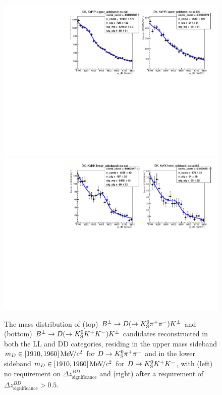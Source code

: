 \begin{figure}[tbp]
    \centering
    \includegraphics[width=0.55\columnwidth]{figures/analysis/charmless_ANA_K_PiPi_bothLLDD_Run1and2_c_upper_sideband_BD_ZSIG.pdf}
    \includegraphics[width=0.55\columnwidth]{figures/analysis/charmless_ANA_K_KK_bothLLDD_Run1and2_c_lower_sideband_BD_ZSIG.pdf}
    \caption{The \B mass distribution of (top) ${{B}^\pm}\rightarrow{\ensuremath{D}}(\rightarrow{\ensuremath{{K}^0_{\mathrm{S}}}}{\ensuremath{{\pi}^+}}{\ensuremath{{\pi}^-}}){{K}^\pm}$ and (bottom) ${{B}^\pm}\rightarrow{\ensuremath{D}}(\rightarrow{\ensuremath{{K}^0_{\mathrm{S}}}}{\ensuremath{{K}^+}}{\ensuremath{{K}^-}}){{K}^\pm}$ candidates reconstructed in both the LL and DD categories, residing in the upper \D mass sideband $m_D\in [1910, 1960]\text{\,Me\kern -0.1em V\!/}c^2$ for $D\rightarrow{\ensuremath{{K}^0_{\mathrm{S}}}}{\ensuremath{{\pi}^+}}{\ensuremath{{\pi}^-}}$ and in the lower sideband $m_D\in [1910, 1960]\text{\,Me\kern -0.1em V\!/}c^2$ for ${D}\rightarrow{\ensuremath{{K}^0_{\mathrm{S}}}}{\ensuremath{{K}^+}}{\ensuremath{{K}^-}}$, with (left) no requirement on $\Delta z^{BD}_{\text{significance}}$ and (right) after a requirement of $\Delta z^{BD}_{\text{significance}} > 0.5$. }
    \label{fig:charmless_Bmass_DK}
\end{figure}



